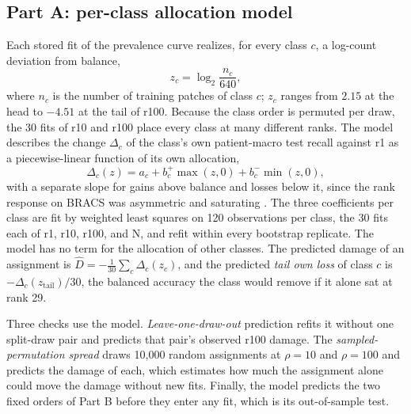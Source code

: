 \documentclass[11pt]{article}
\begin{document}
\subsection{Part A: per-class allocation model}
\label{sec:model}
Each stored fit of the prevalence curve realizes, for every class $c$, a log-count deviation from balance,
\begin{equation}
  z_c = \log_2 \frac{n_c}{640},
  \label{eq:z}
\end{equation}
\noindent where $n_c$ is the number of training patches of class $c$; $z_c$ ranges from $2.15$ at the head to $-4.51$ at the tail of r100. Because the class order is permuted per draw, the 30 fits of r10 and r100 place every class at many different ranks. The model describes the change $\Delta_c$ of the class's own patient-macro test recall against r1 as a piecewise-linear function of its own allocation,
\begin{equation}
  \Delta_c(z) = a_c + b^{+}_c \max(z, 0) + b^{-}_c \min(z, 0),
  \label{eq:model}
\end{equation}
\noindent with a separate slope for gains above balance and losses below it, since the rank response on BRACS was asymmetric and saturating \citep{queisler2026tailBracs}. The three coefficients per class are fit by weighted least squares on 120 observations per class, the 30 fits each of r1, r10, r100, and N, and refit within every bootstrap replicate. The model has no term for the allocation of other classes. The predicted damage of an assignment is $\hat D = -\frac{1}{30}\sum_c \Delta_c(z_c)$, and the predicted \emph{tail own loss} of class $c$ is $-\Delta_c(z_{\text{tail}})/30$, the balanced accuracy the class would remove if it alone sat at rank 29.

Three checks use the model. \emph{Leave-one-draw-out} prediction refits it without one split-draw pair and predicts that pair's observed r100 damage. The \emph{sampled-permutation spread} draws 10,000 random assignments at $\rho=10$ and $\rho=100$ and predicts the damage of each, which estimates how much the assignment alone could move the damage without new fits. Finally, the model predicts the two fixed orders of Part B before they enter any fit, which is its out-of-sample test.
\end{document}
